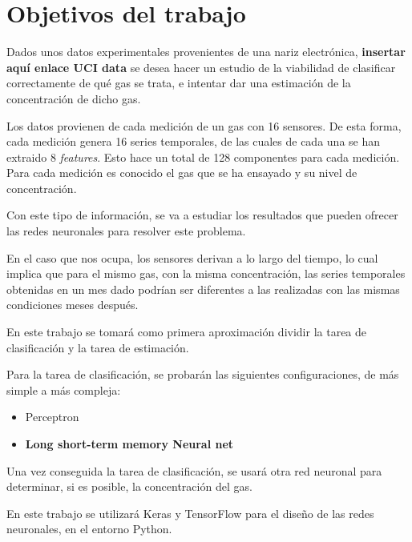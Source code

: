 \chapter{Objetivos del trabajo}

Dados unos datos experimentales provenientes de una nariz electrónica,
\textbf{insertar aquí enlace UCI data} se desea hacer un estudio de la viabilidad de
clasificar correctamente de qué gas se trata,
e intentar dar una estimación de la concentración de dicho gas.

Los datos provienen de cada medición de un gas con 16 sensores.
De esta forma, cada medición genera 16 series temporales, de las cuales de cada una se
han extraido 8 \emph{features}. Esto hace un total de 128 componentes para cada medición.
Para cada medición es conocido el gas que se ha ensayado y su nivel de concentración.

Con este tipo de información, se va a estudiar los resultados que pueden ofrecer las redes neuronales
para resolver este problema.

En el caso que nos ocupa, los sensores derivan a
lo largo del tiempo, lo cual implica que para el mismo gas, con la misma concentración, las series temporales obtenidas
en un mes dado podrían ser diferentes a las realizadas con las mismas condiciones meses después.

En este trabajo se tomará como primera aproximación dividir la tarea de clasificación y la tarea de estimación.

Para la tarea de clasificación, se probarán las siguientes configuraciones, de más simple a más compleja:

\begin{itemize}
    \item Perceptron
    \item \textbf{Long short-term memory  Neural net}
\end{itemize}

Una vez conseguida la tarea de clasificación, se usará otra red neuronal para determinar, si es posible,
la concentración del gas.

En este trabajo se utilizará Keras y TensorFlow para el diseño de las redes neuronales, en el entorno Python.

